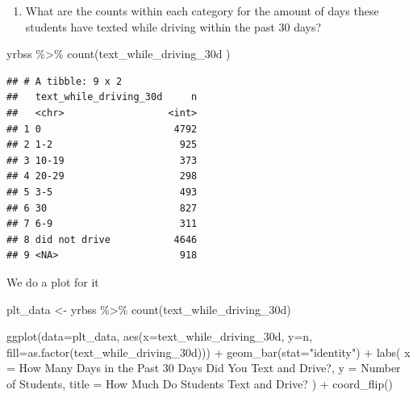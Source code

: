 \documentclass[
]{article}
\newenvironment{Shaded}{\begin{snugshade}}{\end{snugshade}}
\newcommand{\AttributeTok}[1]{\textcolor[rgb]{0.77,0.63,0.00}{#1}}
\newcommand{\FunctionTok}[1]{\textcolor[rgb]{0.00,0.00,0.00}{#1}}
\newcommand{\NormalTok}[1]{#1}
\newcommand{\OtherTok}[1]{\textcolor[rgb]{0.56,0.35,0.01}{#1}}
\newcommand{\SpecialCharTok}[1]{\textcolor[rgb]{0.00,0.00,0.00}{#1}}
\newcommand{\StringTok}[1]{\textcolor[rgb]{0.31,0.60,0.02}{#1}}
\providecommand{\tightlist}{%
  \setlength{\itemsep}{0pt}\setlength{\parskip}{0pt}}
\begin{document}
\begin{enumerate}
\def\labelenumi{\arabic{enumi}.}
\tightlist
\item
  What are the counts within each category for the amount of days these
  students have texted while driving within the past 30 days?
\end{enumerate}

\begin{Shaded}
\begin{Highlighting}[]
\NormalTok{yrbss }\SpecialCharTok{\%\textgreater{}\%}
  \FunctionTok{count}\NormalTok{(text\_while\_driving\_30d )}
\end{Highlighting}
\end{Shaded}

\begin{verbatim}
## # A tibble: 9 x 2
##   text_while_driving_30d     n
##   <chr>                  <int>
## 1 0                       4792
## 2 1-2                      925
## 3 10-19                    373
## 4 20-29                    298
## 5 3-5                      493
## 6 30                       827
## 7 6-9                      311
## 8 did not drive           4646
## 9 <NA>                     918
\end{verbatim}

We do a plot for it

\begin{Shaded}
\begin{Highlighting}[]
\NormalTok{plt\_data }\OtherTok{\textless{}{-}}\NormalTok{ yrbss }\SpecialCharTok{\%\textgreater{}\%} 
  \FunctionTok{count}\NormalTok{(text\_while\_driving\_30d)}

\FunctionTok{ggplot}\NormalTok{(}\AttributeTok{data=}\NormalTok{plt\_data, }\FunctionTok{aes}\NormalTok{(}\AttributeTok{x=}\NormalTok{text\_while\_driving\_30d, }\AttributeTok{y=}\NormalTok{n, }\AttributeTok{fill=}\FunctionTok{as.factor}\NormalTok{(text\_while\_driving\_30d))) }\SpecialCharTok{+}
  \FunctionTok{geom\_bar}\NormalTok{(}\AttributeTok{stat=}\StringTok{"identity"}\NormalTok{) }\SpecialCharTok{+} 
  \FunctionTok{labs}\NormalTok{(}
    \AttributeTok{x =} \StringTok{\textquotesingle{}How Many Days in the Past 30 Days Did You Text and Drive?\textquotesingle{}}\NormalTok{,}
    \AttributeTok{y =} \StringTok{\textquotesingle{}Number of Students\textquotesingle{}}\NormalTok{,}
    \AttributeTok{title =} \StringTok{\textquotesingle{}How Much Do Students Text and Drive?\textquotesingle{}}
\NormalTok{  ) }\SpecialCharTok{+} 
  \FunctionTok{coord\_flip}\NormalTok{()}
\end{Highlighting}
\end{Shaded}
\end{document}
